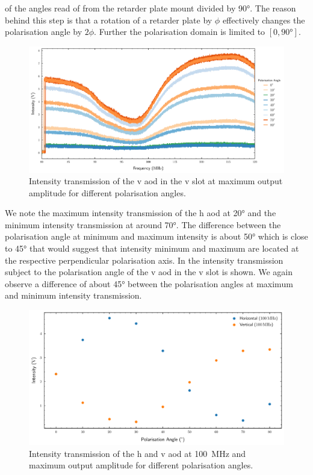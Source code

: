of the angles read of from the retarder plate mount divided by \ang{90}. The
reason behind this step is that a rotation of a retarder plate by $\phi$
effectively changes the polarisation angle by $2\phi$. Further the
polarisation domain is limited to $\left[0,\ang{90}\right]$.
\begin{figure}[htb]
  \centering
  \includegraphics[width=\textwidth]
  {../figure/intensity/distribution/polarisation-vertical.pdf}
  \caption{Intensity transmission of the \gls{v} \gls{aod} in the \gls{v} slot
    at maximum output amplitude for different polarisation angles.
  }\label{fig:intensity_polarisation_v}
\end{figure}
We note the maximum intensity transmission of the \gls{h} \gls{aod} at
\ang{20} and the minimum intensity transmission at around \ang{70}. The
difference between the polarisation angle at minimum and maximum intensity
is about \ang{50} which is close to \ang{45} that would suggest that
intensity minimum and maximum are located at the respective perpendicular
polarisation axis. In  the intensity
transmission subject to the polarisation angle of the \gls{v} \gls{aod} in
the \gls{v} slot is shown. We again observe a difference of about \ang{45}
between the polarisation angles at maximum and minimum intensity transmission.
\begin{figure}[htb]
  \centering
  \includegraphics[width=\textwidth]
  {../figure/intensity/distribution/polarisation.pdf}
  \caption{Intensity transmission of the \gls{h} and \gls{v} \gls{aod} at
    \SI{100}{\mega\hertz} and maximum output amplitude for different
    polarisation angles.
  }\label{fig:intensity_polarisation}
\end{figure}
